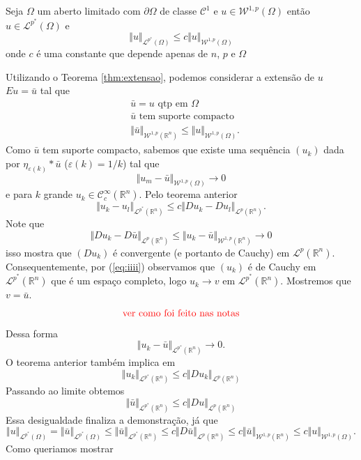 \documentclass[a4paper, 11pt]{book}
\theoremstyle{definition}
\newcommand{\bR}{\mathbb{R}}
\newcommand{\cC}{\mathcal{C}}
\newcommand{\cL}{\mathcal{L}}
\newcommand{\cW}{\mathcal{W}}
\begin{document}
\begin{tbox}
    Seja $\Omega$ um aberto limitado com $\partial\Omega$ de classe $\cC^1$ e $u \in \cW^{1,p}(\Omega)$ então $u \in \cL^{p^*}(\Omega)$ e
    \[
        \Vert u \Vert_{\cL^{p^*}(\Omega)} \leqslant c \Vert u \Vert_{\cW^{1,p}(\Omega)}
    \]
    onde $c$ é uma constante que depende apenas de $n$, $p$ e $\Omega$
\end{tbox}
\begin{prf}
    Utilizando o Teorema \ref{thm:extensao}, podemos considerar a extensão de $u$ $Eu = \bar u$ tal que
    \[
        \begin{aligned}
            &\bar u = u \text{ qtp em } \Omega\\
            &\bar u \text{ tem suporte compacto}\\
            &\Vert \bar u \Vert_{\cW^{1,p}(\bR^n)} \leqslant \Vert u \Vert_{\cW^{1,p}(\Omega)}.
        \end{aligned}
    \]
    Como $\bar u$ tem suporte compacto, sabemos que existe uma sequência $(u_k)$ dada por $\eta_{\varepsilon(k)} * \bar u$ ($\varepsilon(k) = 1/k$) tal que
    \[
        \Vert u_m - \bar u \Vert_{\cW^{1,p}(\Omega)} \to 0
    \]
    e para $k$ grande $u_k \in \cC^{\infty}_c(\bR^n)$.
    Pelo teorema anterior
    \begin{equation} \label{eq:iiii}
        \Vert u_k - u_l \Vert_{\cL^{p^*}(\bR^n)} \leqslant c \Vert Du_k - Du_l \Vert_{\cL^p(\bR^n)}.
    \end{equation}
    Note que
    \[
        \Vert Du_k - D\bar u \Vert_{\cL^p(\bR^n)} \leqslant \Vert u_k - \bar u \Vert_{\cW^{1,p}(\bR^n)} \to 0
    \]
    isso mostra que $(Du_k)$ é convergente (e portanto de Cauchy) em $\cL^p(\bR^n)$.
    Consequentemente, por (\ref{eq:iiii}) observamos que $(u_k)$ é de Cauchy em $\cL^{p^*}(\bR^n)$ que é um espaço completo, logo $u_k \to v$ em $\cL^{p^*}(\bR^n)$.
    Mostremos que $v = \bar u$.
    \[
        \textcolor{red}{\text{ver como foi feito nas notas}}
    \]
    Dessa forma
    \[
        \Vert u_k - \bar u \Vert_{\cL^{p^*}(\bR^n)} \to 0.
    \]
    O teorema anterior também implica em
    \[  
        \Vert u_k \Vert_{\cL^{p^*}(\bR^n)} \leqslant c \Vert Du_k \Vert_{\cL^p(\bR^n)}
    \]
    Passando ao limite obtemos
    \[
        \Vert \bar u \Vert_{\cL^{p^*}(\bR^n)} \leqslant c \Vert D u \Vert_{\cL^p(\bR^n)}
    \]
    Essa desigualdade finaliza a demonstração, já que
    \[
        \Vert u \Vert_{\cL^{p^*}(\Omega)} = \Vert \bar u \Vert_{\cL^{p^*}(\Omega)} \leqslant \Vert \bar u \Vert_{\cL^{p^*}(\bR^n)} \leqslant c \Vert D \bar u \Vert_{\cL^p(\bR^n)} \leqslant c \Vert \bar u \Vert_{\cW^{1,p}(\bR^n)} \leqslant c \Vert u \Vert_{\cW^{1,p}(\Omega)}.
    \]
    Como queriamos mostrar
\end{prf}
\end{document}
